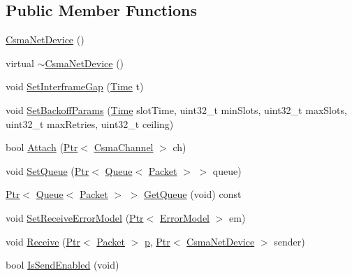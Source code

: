 \subsection*{Public Member Functions}
\begin{DoxyCompactItemize}
\item 
\hyperlink{classns3_1_1CsmaNetDevice_a5005a5403e112dad6ecd2922a9065916}{Csma\+Net\+Device} ()
\item 
virtual \hyperlink{classns3_1_1CsmaNetDevice_af1c8ebf5c098c264e248d025ead3c6a4}{$\sim$\+Csma\+Net\+Device} ()
\item 
void \hyperlink{classns3_1_1CsmaNetDevice_a03c6e2194fff14f295c234aa9e4c1cdd}{Set\+Interframe\+Gap} (\hyperlink{classns3_1_1Time}{Time} t)
\item 
void \hyperlink{classns3_1_1CsmaNetDevice_a8295d286454a3044ac4100d72af25bd9}{Set\+Backoff\+Params} (\hyperlink{classns3_1_1Time}{Time} slot\+Time, uint32\+\_\+t min\+Slots, uint32\+\_\+t max\+Slots, uint32\+\_\+t max\+Retries, uint32\+\_\+t ceiling)
\item 
bool \hyperlink{classns3_1_1CsmaNetDevice_a5e24813945deeace8e8abe4ede602278}{Attach} (\hyperlink{classns3_1_1Ptr}{Ptr}$<$ \hyperlink{classns3_1_1CsmaChannel}{Csma\+Channel} $>$ ch)
\item 
void \hyperlink{classns3_1_1CsmaNetDevice_ae5cc491c6cafc21896c88c8d313c3bfe}{Set\+Queue} (\hyperlink{classns3_1_1Ptr}{Ptr}$<$ \hyperlink{classns3_1_1Queue}{Queue}$<$ \hyperlink{classns3_1_1Packet}{Packet} $>$ $>$ queue)
\item 
\hyperlink{classns3_1_1Ptr}{Ptr}$<$ \hyperlink{classns3_1_1Queue}{Queue}$<$ \hyperlink{classns3_1_1Packet}{Packet} $>$ $>$ \hyperlink{classns3_1_1CsmaNetDevice_a40e2c34436dde9efd9d1f1c86594b4d0}{Get\+Queue} (void) const 
\item 
void \hyperlink{classns3_1_1CsmaNetDevice_aa129e661ab34da9e2145f69847dd5447}{Set\+Receive\+Error\+Model} (\hyperlink{classns3_1_1Ptr}{Ptr}$<$ \hyperlink{classns3_1_1ErrorModel}{Error\+Model} $>$ em)
\item 
void \hyperlink{classns3_1_1CsmaNetDevice_a640e48cd26f676994e0d76b5f34a5367}{Receive} (\hyperlink{classns3_1_1Ptr}{Ptr}$<$ \hyperlink{classns3_1_1Packet}{Packet} $>$ \hyperlink{lte__link__budget__x2__handover__measures_8m_ac9de518908a968428863f829398a4e62}{p}, \hyperlink{classns3_1_1Ptr}{Ptr}$<$ \hyperlink{classns3_1_1CsmaNetDevice}{Csma\+Net\+Device} $>$ sender)
\item 
bool \hyperlink{classns3_1_1CsmaNetDevice_a40e5946f8807cb9c65857789c3c2b269}{Is\+Send\+Enabled} (void)

\end{DoxyCompactItemize}
